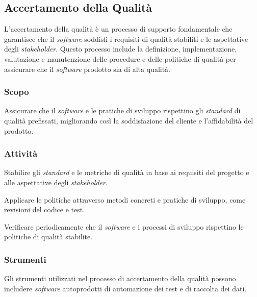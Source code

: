 \subsection{Accertamento della Qualità}

L'accertamento della qualità è un processo di supporto fondamentale che
garantisce che il \textit{software} soddisfi i requisiti di qualità stabiliti e
le aspettative degli \textit{stakeholder}.
Questo processo include la definizione, implementazione, valutazione e
manutenzione delle procedure e delle politiche di qualità per assicurare che
il \textit{software} prodotto sia di alta qualità.

\subsubsection{Scopo}
Assicurare che il \textit{software} e le pratiche di sviluppo rispettino gli
\textit{standard} di qualità prefissati, migliorando così la soddisfazione del cliente e
l'affidabilità del prodotto.

\subsubsection{Attività}
Stabilire gli
	  \textit{standard} e le metriche di qualità in base ai requisiti del progetto e
	  alle aspettative degli \textit{stakeholder}.

Applicare le
	  politiche attraverso metodi concreti e pratiche di sviluppo, come
	  revisioni del codice e test.

Verificare periodicamente che
	  il \textit{software} e i processi di sviluppo rispettino le politiche
	  di qualità stabilite.



\subsubsection{Strumenti}
Gli strumenti utilizzati nel processo di accertamento della qualità possono
includere \textit{software} autoprodotti di automazione dei test e di raccolta
dei dati.
